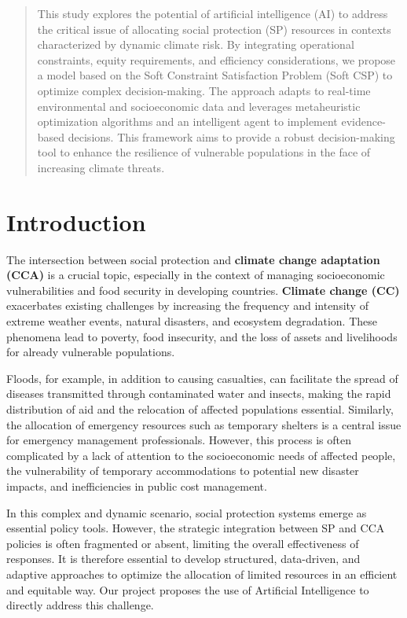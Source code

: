 \begin{abstract}
    This study explores the potential of artificial intelligence (AI) to
    address the critical issue of allocating social protection (SP)
    resources in contexts characterized by dynamic climate risk. By
    integrating operational constraints, equity requirements, and
    efficiency considerations, we propose a model based on the Soft
    Constraint Satisfaction Problem (Soft CSP) to optimize complex
    decision-making. The approach adapts to real-time environmental
    and socioeconomic data and leverages metaheuristic optimization
    algorithms and an intelligent agent to implement evidence-based
    decisions. This framework aims to provide a robust
    decision-making tool to enhance the resilience of vulnerable
    populations in the face of increasing climate threats.
\end{abstract}

\section{Introduction}
The intersection between social protection and \textbf{climate
    change adaptation (CCA)} is a crucial topic, especially in the
context of managing socioeconomic vulnerabilities and food security
in developing countries. \textbf{Climate change (CC)} exacerbates
existing challenges by increasing the frequency and intensity of
extreme weather events, natural disasters, and ecosystem degradation.
These phenomena lead to poverty, food insecurity, and the loss of
assets and livelihoods for already vulnerable populations.

Floods, for example, in addition to causing casualties, can
facilitate the spread of diseases transmitted through contaminated
water and insects, making the rapid distribution of aid and the
relocation of affected populations essential. Similarly, the
allocation of emergency resources such as temporary shelters is a
central issue for emergency management professionals. However, this
process is often complicated by a lack of attention to the
socioeconomic needs of affected people, the vulnerability of
temporary accommodations to potential new disaster impacts, and
inefficiencies in public cost management.

In this complex and dynamic scenario, social protection systems
emerge as essential policy tools. However, the strategic integration
between SP and CCA policies is often fragmented or absent, limiting
the overall effectiveness of responses. It is therefore essential
to develop structured, data-driven, and adaptive approaches to
optimize the allocation of limited resources in an efficient and
equitable way. Our project proposes the use of Artificial
Intelligence to directly address this challenge.

